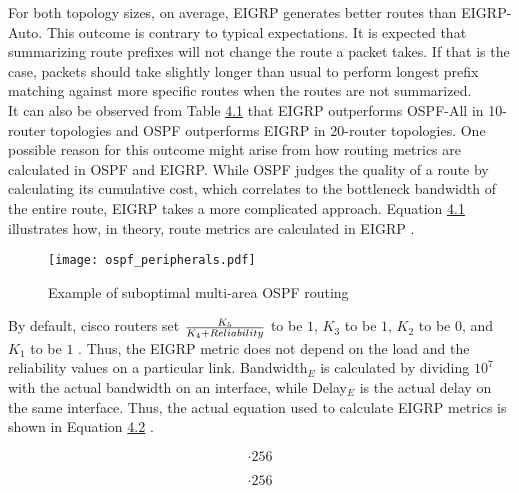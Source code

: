 \documentclass{uiucthesis2021}
\begin{document}
\noindent For both topology sizes, on average, EIGRP generates better routes than EIGRP-Auto. This outcome is contrary to typical expectations. It is expected that summarizing route prefixes will not change the route a packet takes. If that is the case, packets should take slightly longer than usual to perform longest prefix matching against more specific routes when the routes are not summarized. \\

\noindent It can also be observed from Table \hyperref[t41]{4.1} that EIGRP outperforms OSPF-All in 10-router topologies and OSPF outperforms EIGRP in 20-router topologies. One possible reason for this outcome might arise from how routing metrics are calculated in OSPF and EIGRP. While OSPF judges the quality of a route by calculating its cumulative cost, which correlates to the bottleneck bandwidth of the entire route, EIGRP takes a more complicated approach. Equation \hyperref[e41]{4.1} illustrates how, in theory, route metrics are calculated in EIGRP \cite{retana2000eigrp}. \\

\label{f41}
\begin{figure}[H]
\texttt{[image: ospf\_peripherals.pdf]}
\centering
\caption{Example of suboptimal multi-area OSPF routing}
\centering
\end{figure}

\noindent By default, cisco routers set $K_5 \over K_4 + Reliability$ to be $1$, $K_3$ to be $1$, $K_2$ to be $0$, and $K_1$ to be $1$ \cite{retana2000eigrp}. Thus, the EIGRP metric does not depend on the load and the reliability values on a particular link. Bandwidth$_E$ is calculated by dividing $10^7$ with the actual bandwidth on an interface, while Delay$_E$ is the actual delay on the same interface. Thus, the actual equation used to calculate EIGRP metrics is shown in Equation \hyperref[e42]{4.2} \cite{retana2000eigrp}.

\label{e41}
\begin{equation}
[(K_1 \cdot Bandwidth_E + K_2 \cdot {Bandwidth_E \over 256 - Load} + K_3 \cdot Delay_E) \cdot {K_5 \over K_4 + Reliability}] \cdot 256
\end{equation}

\label{e42}
\begin{equation}
[({10^7 \over Bandwidth} + Delay)] \cdot 256
\end{equation}
\end{document}
